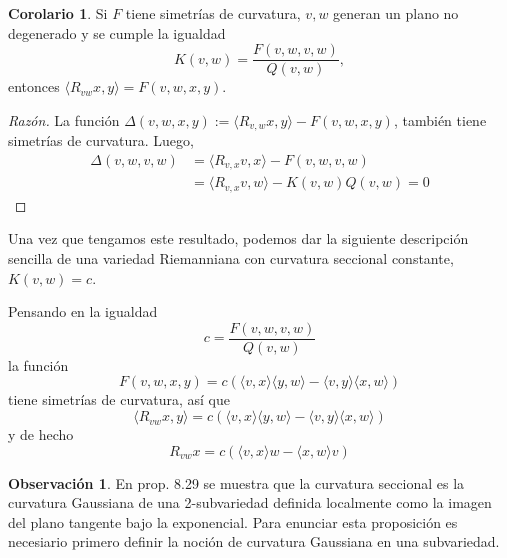 \documentclass[spanish]{book}
\theoremstyle{definition}
\newtheorem*{coro}{Corolario}
\newtheorem*{obs}{Observación}
\newtheorem*{ejem}{Ejemplo}
\newcommand{\R}{\mathbb{R}}
\begin{document}
		\begin{coro}
		Si $F$ tiene simetrías de curvatura, $v,w$ generan un plano no degenerado y se cumple la igualdad
		\[K(v,w)=\frac{F(v,w,v,w)}{Q(v,w)},\]
		entonces $\langle R_{vw}x,y\rangle=F(v,w,x,y)$.
	\end{coro}
	\begin{proof}[Razón]
		La función $\Delta(v,w,x,y):=\langle R_{v,w}x,y\rangle-F(v,w,x,y)$, también tiene simetrías de curvatura. Luego,
		\begin{align*}
			\Delta(v,w,v,w)&=\langle R_{v,x}v,x\rangle-F(v,w,v,w)\\
			&=\langle R_{v,x}v,w\rangle-K(v,w)Q(v,w)=0
		\end{align*}
	\end{proof}
	Una vez que tengamos este resultado, podemos dar la siguiente descripción sencilla de una variedad Riemanniana con curvatura seccional constante, $K(v,w)=c$.
	
	Pensando en la igualdad
	\[c=\frac{F(v,w,v,w)}{Q(v,w)}\]
	la función
	\[F(v,w,x,y)=c(\langle v,x\rangle\langle y,w\rangle -\langle v,y\rangle \langle x,w\rangle)\]
	tiene simetrías de curvatura, así que
	\[\langle R_{vw}x,y\rangle=c(\langle v,x\rangle\langle y,w\rangle -\langle v,y\rangle \langle x,w\rangle)\]
	y de hecho
	\[R_{vw}x=c(\langle v,x\rangle w-\langle x,w\rangle v)\]
	
	\begin{obs}
		En \cite{Lee-riem} prop. 8.29 se muestra que la curvatura seccional es la curvatura Gaussiana de una 2-subvariedad definida localmente como la imagen del plano tangente bajo la exponencial. Para enunciar esta proposición es necesiario primero definir la noción de curvatura Gaussiana en una subvariedad.
	\end{obs}
	
	\iffalse
	\begin{ejem}[La gráfica de una función entre espacio euclideanos]
		Sea $f:\R^m\to \R^{n-m}\approx\R^k$. Trataremos de encontrar el tensor de curvatura de la gráfica de esta función.
		
		Una parametrización local está dada por
		\[(x^1,\ldots,x^m)\mapsto (x^1,\ldots,x^m,f_1(x^1,\ldots,x^m),\ldots,f_k(x^1,\ldots,x^m))\]
		y los vectores básicos del espacio tangente en cada punto son
		\[\frac{\partial}{\partial x^i}\longleftrightarrow\left(0,\ldots,\underbrace{1}_{i},\ldots,0,\frac{\partial f}{\partial x^i},\ldots,\frac{\partial f_k}{\partial x^i}\right)\]
		y luego la métrica es
		\[g_{ij}=\begin{cases}
			\begin{aligned}
				1+\left(\frac{\partial f_1}{\partial x^i}\right)^2+\ldots+\left(\frac{\partial f_k}{\partial x^i}\right)^2\qquad\qquad\qquad&\text{si }i=j\\
			\left(\frac{\partial f_1}{\partial x^i}\right)\left(\frac{\partial f_1}{\partial x^j}\right)+\ldots+	\left(\frac{\partial f_k}{\partial x^i}\right)\left(\frac{\partial f_k}{\partial x^j}\right)\qquad&\text{si }i\neq j
			\end{aligned}
		\end{cases}\]
	\end{ejem}
	\fi
	
\end{document}
